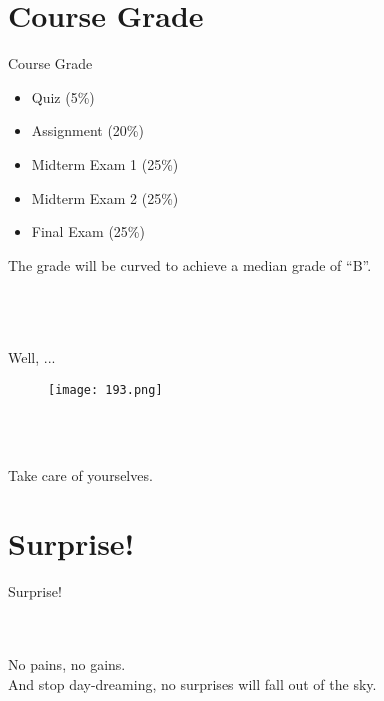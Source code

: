 \documentclass{beamer}
\begin{document}
\section{Course Grade}
\begin{frame}[allowframebreaks]{Course Grade}
	
	\begin{itemize}
		\item  Quiz (5\%)
		\item  Assignment (20\%)
		\item  Midterm Exam 1 (25\%)
		\item  Midterm Exam 2 (25\%)
		\item  Final Exam (25\%)
	\end{itemize}
	The grade will be curved to achieve a median grade of ``\alert{B}''.
	\\~\\~\\~
	\begin{center}
		Well, ...
	\end{center}
	\newpage
	\begin{figure}[H]
		\centering
		\texttt{[image: 193.png]}
	\end{figure}
	\noindent 
	\\~\\
\begin{center}
	
	Take care of yourselves.
\end{center}	
	
\end{frame}



\section{Surprise!}
\begin{frame}[allowframebreaks]{Surprise!}
	
	\begin{center}
		\\~\\No pains, no gains. \\And stop day-dreaming, no surprises will fall out of the sky.
	\end{center}
	
	
\end{frame}
\end{document}
